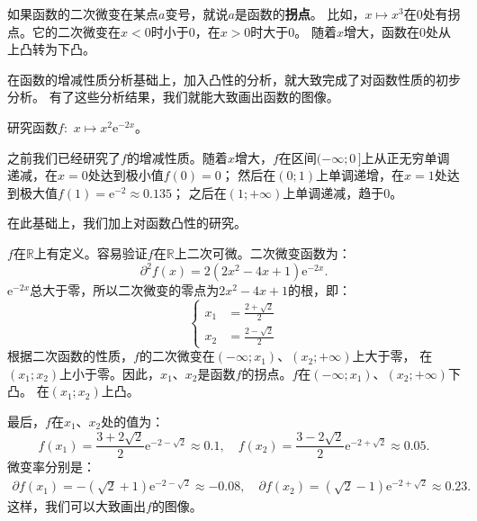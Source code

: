\documentclass[12pt,UTF8,fontset=none]{ctexbook}
\begin{document}
如果函数的二次微变在某点$a$变号，就说$a$是函数的\textbf{拐点}。
比如，$x\mapsto x^3$在$0$处有拐点。它的二次微变在$x<0$时小于$0$，在$x>0$时大于$0$。
随着$x$增大，函数在$0$处从上凸转为下凸。

在函数的增减性质分析基础上，加入凸性的分析，就大致完成了对函数性质的初步分析。
有了这些分析结果，我们就能大致画出函数的图像。

\begin{et}
    研究函数$f:\,\,x\mapsto x^2 \mathrm{e}^{-2x}$。
\end{et}

\begin{so}

    之前我们已经研究了$f$的增减性质。随着$x$增大，$f$在区间$(-\infty; 0\,]$上从正无穷单调递减，在$x = 0$处达到极小值$f(0) = 0$；
    然后在$(0; 1)$上单调递增，在$x = 1$处达到极大值$f(1) = \mathrm{e}^{-2} \approx 0.135$；
    之后在$(1; +\infty)$上单调递减，趋于$0$。

    在此基础上，我们加上对函数凸性的研究。

    $f$在$\mathbb{R}$上有定义。容易验证$f$在$\mathbb{R}$上二次可微。二次微变函数为：
    $$ \partial^2 f (x) = 2(2x^2 - 4x + 1)\mathrm{e}^{-2x}.$$
    $\mathrm{e}^{-2x}$总大于零，所以二次微变的零点为$2x^2 - 4x + 1$的根，即：
    $$  
        \left\{ 
            \begin{array}{cl}
                x_1 &= \frac{2 + \sqrt{2}}{2} \\
                x_2 &= \frac{2 - \sqrt{2}}{2} 
            \end{array}
        \right.
    $$
    根据二次函数的性质，$f$的二次微变在$(-\infty; x_1)$、$(x_2; +\infty)$上大于零，
    在$(x_1; x_2)$上小于零。因此，$x_1$、$x_2$是函数$f$的拐点。$f$在$(-\infty; x_1)$、$(x_2; +\infty)$下凸。
    在$(x_1; x_2)$上凸。

    最后，$f$在$x_1$、$x_2$处的值为：
    $$ f(x_1) = \frac{3 + 2\sqrt{2}}{2} \mathrm{e}^{-2-\sqrt{2}} \approx 0.1, \quad f(x_2) = \frac{3 - 2\sqrt{2}}{2} \mathrm{e}^{-2+\sqrt{2}} \approx 0.05. $$
    微变率分别是：
    \begin{align*}
        \partial f(x_1) = -(\sqrt{2} + 1)\mathrm{e}^{-2-\sqrt{2}} \approx -0.08, \quad  \partial f(x_2) = (\sqrt{2} - 1)\mathrm{e}^{-2+\sqrt{2}} \approx 0.23. 
    \end{align*}
    这样，我们可以大致画出$f$的图像。
\end{so}
\end{document}
